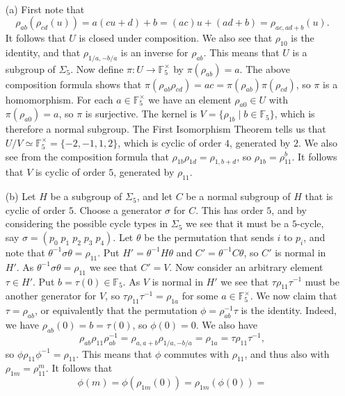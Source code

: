 \documentclass{amsart}
\newcommand{\F}         {{\mathbb{F}}}
\newcommand{\tht}       {\theta}
\newcommand{\sg}        {\sigma}
\newcommand{\Sg}        {\Sigma}
\newcommand{\st}        {\;|\;}
\newcommand{\tm}        {\times}
\renewcommand{\:}{\colon}
\newenvironment{solution}{\SolutionInline}{\endSolutionInline}
\theoremstyle{definition}
\renewenvironment{solution}{\SolutionAtEnd}{\endSolutionAtEnd}
\begin{document}
\begin{solution}\ \\
 \begin{itemize}
  \item[(a)] First note that 
   \[ \rho_{ab}(\rho_{cd}(u)) = 
       a(cu+d)+b = (ac)u+(ad+b) = \rho_{ac,ad+b}(u).
   \] 
   It follows that $U$ is closed under composition.  We also see that
   $\rho_{10}$ is the identity, and that $\rho_{1/a,-b/a}$ is an
   inverse for $\rho_{ab}$.  This means that $U$ is a subgroup of
   $\Sg_5$.  Now define $\pi\:U\to\F_5^\tm$ by $\pi(\rho_{ab})=a$.
   The above composition formula shows that
   $\pi(\rho_{ab}\rho_{cd})=ac=\pi(\rho_{ab})\pi(\rho_{cd})$, so $\pi$
   is a homomorphism.  For each $a\in\F_5^\tm$ we have an element
   $\rho_{a0}\in U$ with $\pi(\rho_{a0})=a$, so $\pi$ is surjective.
   The kernel is $V=\{\rho_{1b}\st b\in\F_5\}$, which is therefore a
   normal subgroup.  The First Isomorphism Theorem tells us that
   $U/V\simeq\F_5^\tm=\{-2,-1,1,2\}$, which is cyclic of order $4$,
   generated by $2$.  We also see from the composition formula that
   $\rho_{1b}\rho_{1d}=\rho_{1,b+d}$, so $\rho_{1b}=\rho_{11}^b$.  It
   follows that $V$ is cyclic of order $5$, generated by $\rho_{11}$.
  \item[(b)] Let $H$ be a subgroup of $\Sg_5$, and let $C$ be a normal
   subgroup of $H$ that is cyclic of order $5$.  Choose a generator
   $\sg$ for $C$.  This has order $5$, and by considering the possible
   cycle types in $\Sg_5$ we see that it must be a $5$-cycle, say
   $\sg=(p_0\;p_1\;p_2\;p_3\;p_4)$.  Let $\tht$ be the permutation
   that sends $i$ to $p_i$, and note that
   $\tht^{-1}\sg\tht=\rho_{11}$.  Put $H'=\tht^{-1}H\tht$ and
   $C'=\tht^{-1}C\tht$, so $C'$ is normal in $H'$.  As
   $\tht^{-1}\sg\tht=\rho_{11}$ we see that $C'=V$.  Now consider an
   arbitrary element $\tau\in H'$.  Put $b=\tau(0)\in\F_5$.  As $V$ is
   normal in $H'$ we see that $\tau\rho_{11}\tau^{-1}$ must be another
   generator for $V$, so $\tau\rho_{11}\tau^{-1}=\rho_{1a}$ for some
   $a\in\F_5^\tm$.  We now claim that $\tau=\rho_{ab}$, or
   equivalently that the permutation $\phi=\rho_{ab}^{-1}\tau$ is the
   identity.  Indeed, we have $\rho_{ab}(0)=b=\tau(0)$, so
   $\phi(0)=0$.  We also have
   \[ \rho_{ab}\rho_{11}\rho_{ab}^{-1}=\rho_{a,a+b}\rho_{1/a,-b/a}=
    \rho_{1a} = \tau\rho_{11}\tau^{-1},
   \]
   so $\phi\rho_{11}\phi^{-1}=\rho_{11}$.  This means that $\phi$
   commutes with $\rho_{11}$, and thus also with
   $\rho_{1m}=\rho_{11}^m$.  It follows that 
   \[ \phi(m) = \phi(\rho_{1m}(0)) = \rho_{1m}(\phi(0)) = 
\]
\end{itemize}
\end{solution}
\end{document}
